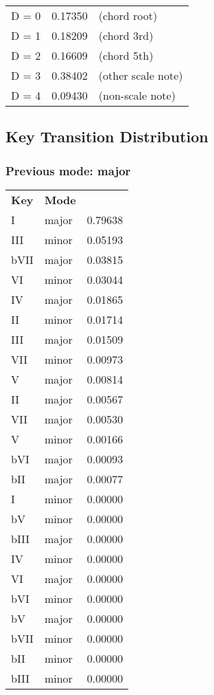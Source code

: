 \begin{tabular}{l l l}
D = 0 & 0.17350 & (chord root)\\
D = 1 & 0.18209 & (chord 3rd)\\
D = 2 & 0.16609 & (chord 5th)\\
D = 3 & 0.38402 & (other scale note)\\
D = 4 & 0.09430 & (non-scale note)\\
\end{tabular}


\subsection{Key Transition Distribution}

\subsubsection*{Previous mode: major}

\begin{tabular}{l l l}
\textbf{Key} & \textbf{Mode} \\
I & major & 0.79638 \\
III & minor & 0.05193 \\
bVII & major & 0.03815 \\
VI & minor & 0.03044 \\
IV & major & 0.01865 \\
II & minor & 0.01714 \\
III & major & 0.01509 \\
VII & minor & 0.00973 \\
V & major & 0.00814 \\
II & major & 0.00567 \\
VII & major & 0.00530 \\
V & minor & 0.00166 \\
bVI & major & 0.00093 \\
bII & major & 0.00077 \\
I & minor & 0.00000 \\
bV & minor & 0.00000 \\
bIII & major & 0.00000 \\
IV & minor & 0.00000 \\
VI & major & 0.00000 \\
bVI & minor & 0.00000 \\
bV & major & 0.00000 \\
bVII & minor & 0.00000 \\
bII & minor & 0.00000 \\
bIII & minor & 0.00000 \\
\end{tabular}

